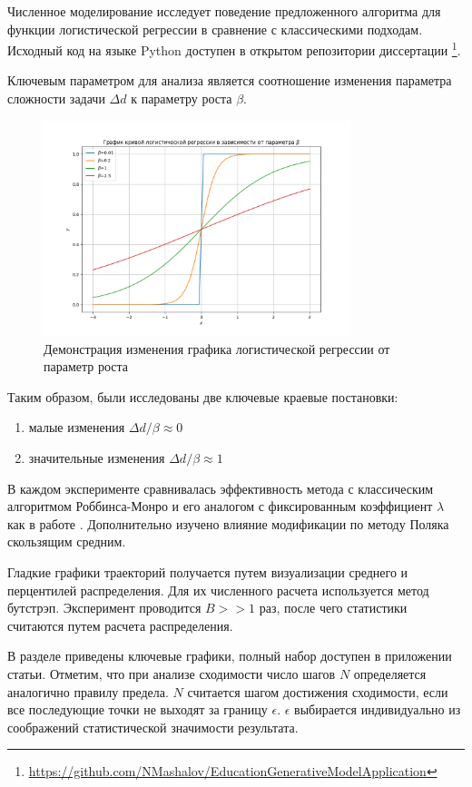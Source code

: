 Численное моделирование исследует поведение предложенного алгоритма для функции логистической регрессии в сравнение с классическими подходам.
Исходный код на языке Python доступен в открытом репозитории диссертации
\footnote{\url{https://github.com/NMashalov/EducationGenerativeModelApplication}}.

Ключевым параметром для анализа является соотношение изменения параметра сложности задачи $\Delta d$ к параметру роста ${\beta}$.
\begin{figure}[h]
    \centering
    \includegraphics[width=0.8\textwidth]{assets/work/rating/logistic.png}
    \caption{Демонстрация изменения графика логистической регрессии от параметр роста}
    \label{logistic_figure}
\end{figure}
Таким образом, были исследованы две ключевые краевые постановки: \begin{enumerate}
    \item малые изменения  $\Delta d / \beta \approx 0$ 
    \item значительные изменения $\Delta d / \beta \approx 1$ 
\end{enumerate}
В каждом эксперименте сравнивалась эффективность метода с классическим алгоритмом Роббинса-Монро и его аналогом с фиксированным коэффициент $\lambda$ как в работе \cite{yazidi2020balanced}. Дополнительно изучено влияние модификации по методу Поляка скользящим средним. 

Гладкие графики траекторий получается путем визуализации среднего и перцентилей распределения. Для их численного расчета используется метод бутстрэп.
Эксперимент проводится $B >> 1$ раз, после чего статистики считаются путем расчета распределения.   

В разделе приведены ключевые графики, полный набор доступен в приложении статьи. Отметим, что при анализе сходимости число шагов $N$ определяется аналогично правилу предела.
$N$ считается шагом достижения сходимости,
если все последующие точки не выходят за границу $\epsilon$.  $\epsilon$ выбирается индивидуально из соображений статистической значимости результата. 


